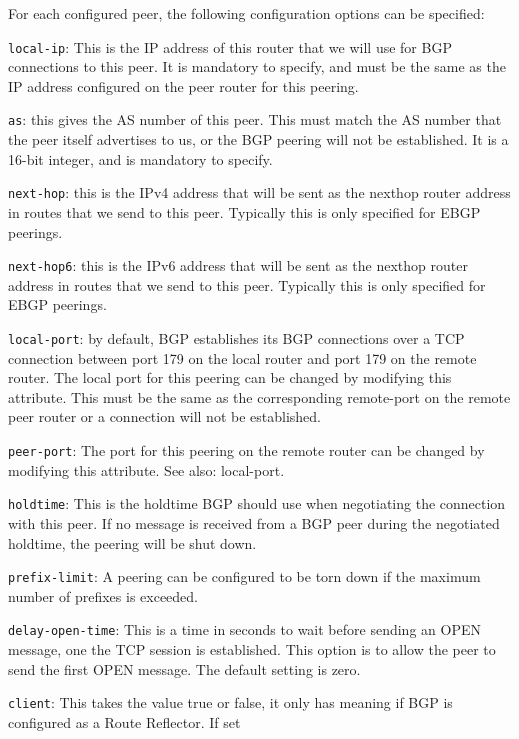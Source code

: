 \begin{description}
  For each configured {\stt peer}, the following
  configuration options can be specified:
\begin{description}
\item{\tt local-ip}: This is the IP address of this router that we
  will use for BGP connections to this peer.  It is mandatory to
  specify, and must be the same as the IP address configured on the
  peer router for this peering.
\item{\tt as}: this gives the AS number of this peer.  This must match
  the AS number that the peer itself advertises to us, or the BGP
  peering will not be established.  It is a 16-bit integer, and is
  mandatory to specify.
\item{\tt next-hop}: this is the IPv4 address that will be sent as the
  nexthop router address in routes that we send to this peer.
  Typically this is only specified for EBGP peerings.
\item{\tt next-hop6}: this is the IPv6 address that will be sent as the
  nexthop router address in routes that we send to this peer.
  Typically this is only specified for EBGP peerings.
\item{\tt local-port}: by default, BGP establishes its BGP connections
  over a TCP connection between port 179 on the local router and port
  179 on the remote router.  The local port for this peering can be
  changed by modifying this attribute.  This must be the same as the
  corresponding {\stt remote-port} on the remote peer router or a
  connection will not be established.
\item{\tt peer-port}: The port for this peering on the remote router
  can be changed by modifying this attribute. See also: {\stt
  local-port}.
\item{\tt holdtime}: This is the holdtime BGP should use when
  negotiating the connection with this peer.  If no message is
  received from a BGP peer during the negotiated holdtime, the
  peering will be shut down.
\item{\tt prefix-limit}: A peering can be configured to be torn down
if the {\stt maximum} number of prefixes is exceeded.
\item{\tt delay-open-time}: This is a time in seconds to wait before
sending an OPEN message, one the TCP session is established. This
option is to allow the peer to send the first OPEN message. The
default setting is zero.
\item{\tt client}: This takes the value {\stt true} or {\stt false},
it only has meaning if BGP is configured as a Route Reflector. If set

\end{description}
\end{description}
